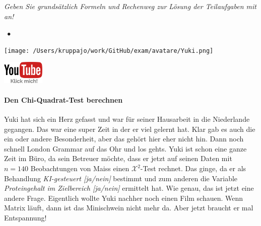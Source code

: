 \documentclass[a4paper, 9pt]{scrartcl}\usepackage[]{graphicx}\usepackage[]{xcolor}
\begin{document}
\textit{Geben Sie grundsätzlich Formeln und Rechenweg zur Lösung der Teilaufgaben mit an!} \\[1Ex]
 

 
\ifcollection
\begin{flushright}
\tiny\vspace{-3Ex}
\textbf{\examinhaltstart}
\exammodulestat $\;\bullet$
\exammodulestatbbv 
\vspace{-4Ex}
\end{flushright}
\begin{minipage}[t]{0.5\textwidth}
\texttt{[image: /Users/kruppajo/work/GitHub/exam/avatare/Yuki.png]}
\end{minipage}
\begin{minipage}[t]{0.5\textwidth}
\hfill
\href{https://youtu.be/-Kva5wc5Elw}{\includegraphics[width = 2cm]{img/youtube}}
\end{minipage}
\vspace{-3Ex}
\fi



\ifcollection
\paragraph{Den Chi-Quadrat-Test berechnen}
\fi

Yuki hat sich ein Herz gefasst und war für seiner Hausarbeit in die Niederlande gegangen. Das war eine super Zeit in der er viel gelernt hat. Klar gab es auch die ein oder andere Besonderheit, aber das gehört hier eher nicht hin. Dann noch schnell London Grammar auf das Ohr und los gehts. Yuki ist schon eine ganze Zeit im Büro, da sein Betreuer möchte, dass er jetzt auf seinen Daten mit $n = 140$ Beobachtungen von Maiss einen $\mathcal{X}^2$-Test rechnet. Das ginge, da er als Behandlung \textit{KI-gesteuert [ja/nein]} bestimmt und zum anderen die Variable \textit{Proteingehalt im Zielbereich [ja/nein]} ermittelt hat. Wie genau, das ist jetzt eine andere Frage. Eigentlich wollte Yuki nachher noch einen Film schauen. Wenn Matrix läuft, dann ist das Minischwein nicht mehr da. Aber jetzt braucht er mal Entspannung!

\vspace{5Ex}
\end{document}
